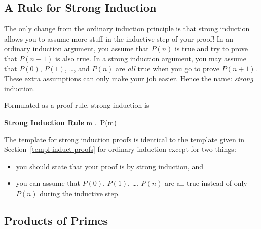 \subsection{A Rule for Strong Induction}


The only change from the ordinary induction principle is that strong
induction allows you to assume more stuff in the inductive step of
your proof!  In an ordinary induction argument, you assume that $P(n)$
is true and try to prove that $P(n+1)$ is also true.  In a strong
induction argument, you may assume that $P(0)$, $P(1)$, \dots, and
$P(n)$ are \emph{all} true when you go to prove $P(n+1)$.  These extra
assumptions can only make your job easier.  Hence the name:
\emph{strong} induction.

Formulated as a proof rule, strong induction is
\begin{rul*} \textbf{Strong Induction Rule}
{\forall m \in \naturals.\, P(m)}
\end{rul*}

The template for strong induction proofs is identical to the template
given in Section~\ref{templ-induct-proofs} for ordinary induction
except for two things:
\begin{itemize}

\item
you should state that your proof is by strong induction, and

\item
you can assume that $P(0)$, $P(1)$, \dots, $P(n)$ are all true instead
of only $P(n)$ during the inductive step.

\end{itemize}

\subsection{Products of Primes}

